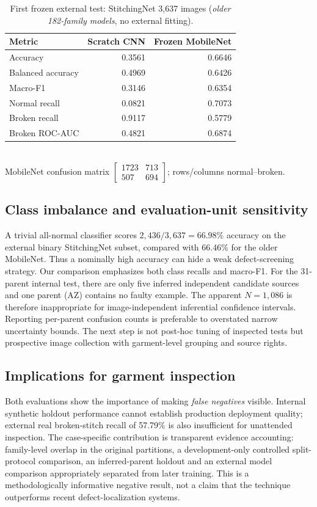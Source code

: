 \documentclass[conference,a4paper]{IEEEtran}
\begin{document}
\begin{table}[!t]\centering
\caption{First frozen external test: StitchingNet 3,637 images (\emph{older 182-family models}, no external fitting).}\label{tab:external}
\setlength{\tabcolsep}{2.3pt}\footnotesize
\begin{tabular}{lrr}\toprule
Metric & Scratch CNN & Frozen MobileNet\\\midrule
Accuracy & 0.3561 & 0.6646\\
Balanced accuracy & 0.4969 & 0.6426\\
Macro-F1 & 0.3146 & 0.6354\\
Normal recall & 0.0821 & 0.7073\\
Broken recall & 0.9117 & 0.5779\\
Broken ROC-AUC & 0.4821 & 0.6874\\\bottomrule
\end{tabular}\\[1mm]
\scriptsize MobileNet confusion matrix $\left[\begin{smallmatrix}1723&713\\507&694\end{smallmatrix}\right]$; rows/columns normal--broken.
\end{table}

\subsection{Class imbalance and evaluation-unit sensitivity}
A trivial all-normal classifier scores $2{,}436/3{,}637=66.98\%$ accuracy on the external binary StitchingNet subset, compared with 66.46\% for the older MobileNet. Thus a nominally high accuracy can hide a weak defect-screening strategy. Our comparison emphasizes both class recalls and macro-F1. For the 31-parent internal test, there are only five inferred independent candidate sources and one parent (AZ) contains no faulty example. The apparent $N=1{,}086$ is therefore inappropriate for image-independent inferential confidence intervals. Reporting per-parent confusion counts is preferable to overstated narrow uncertainty bounds. The next step is not post-hoc tuning of inspected tests but prospective image collection with garment-level grouping and source rights.

\subsection{Implications for garment inspection}
Both evaluations show the importance of making \emph{false negatives} visible. Internal synthetic holdout performance cannot establish production deployment quality; external real broken-stitch recall of 57.79\% is also insufficient for unattended inspection. The case-specific contribution is transparent evidence accounting: family-level overlap in the original partitions, a development-only controlled split-protocol comparison, an inferred-parent holdout and an external model comparison appropriately separated from later training. This is a methodologically informative negative result, not a claim that the technique outperforms recent defect-localization systems.
\end{document}
